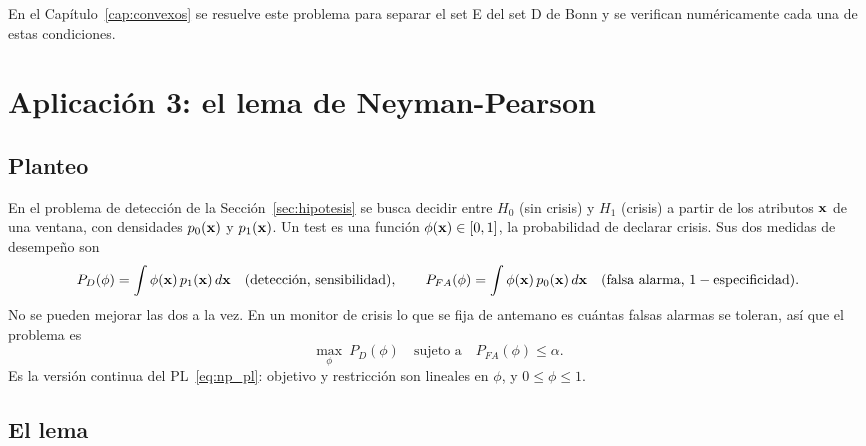 En el Capítulo~\ref{cap:convexos} se resuelve este problema para separar el set E del set D de Bonn y se verifican
numéricamente cada una de estas condiciones.

\section{Aplicación 3: el lema de Neyman-Pearson}
\label{sec:neyman_pearson}

\subsection{Planteo}

En el problema de detección de la Sección~\ref{sec:hipotesis} se busca decidir entre $H_0$ (sin crisis) y $H_1$
(crisis) a partir de los atributos $\mathbf{x}$ de una ventana, con densidades $p_0(\mathbf{x})$ y $p_1(\mathbf{x})$. Un test es una
función $\phi(\mathbf{x}) \in [0,1]$, la probabilidad de declarar crisis. Sus dos medidas de desempeño son
\begin{equation}
  P_D(\phi) = \int\phi(\mathbf{x})\,p_1(\mathbf{x})\,d\mathbf{x} \quad\text{(detección, sensibilidad)},
  \qquad
  P_{FA}(\phi) = \int\phi(\mathbf{x})\,p_0(\mathbf{x})\,d\mathbf{x} \quad\text{(falsa alarma, } 1 - \text{especificidad)}.
\end{equation}
No se pueden mejorar las dos a la vez. En un monitor de crisis lo que se fija de antemano es cuántas falsas
alarmas se toleran, así que el problema es
\begin{equation}
  \max_{\phi}\ P_D(\phi) \quad\text{sujeto a}\quad P_{FA}(\phi) \le \alpha.
  \label{eq:np_problema}
\end{equation}
Es la versión continua del PL~\eqref{eq:np_pl}: objetivo y restricción son lineales en $\phi$, y $0 \le \phi \le 1$.

\subsection{El lema}

